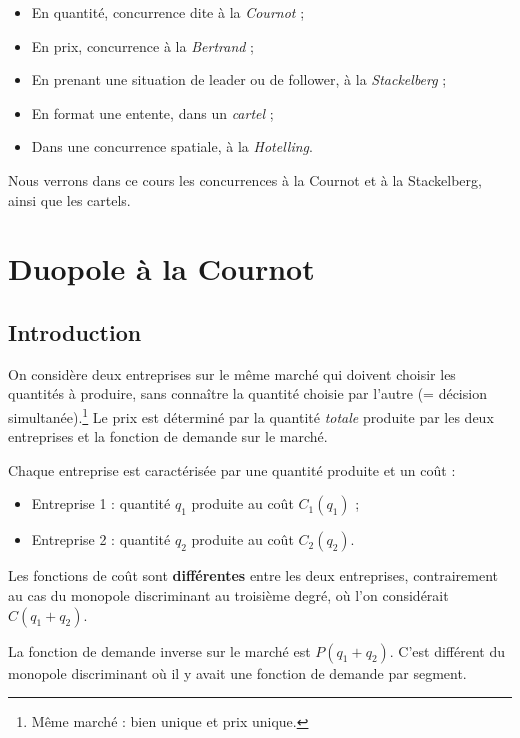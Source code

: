 \documentclass[
]{book}
\providecommand{\tightlist}{%
  \setlength{\itemsep}{0pt}\setlength{\parskip}{0pt}}
\theoremstyle{definition}
\theoremstyle{definition}
\theoremstyle{definition}
\theoremstyle{definition}
\theoremstyle{remark}
\begin{document}
\begin{itemize}
\tightlist
\item
  En quantité, concurrence dite à la \emph{Cournot} ;
\item
  En prix, concurrence à la \emph{Bertrand} ;
\item
  En prenant une situation de leader ou de follower, à la \emph{Stackelberg} ;
\item
  En format une entente, dans un \emph{cartel} ;
\item
  Dans une concurrence spatiale, à la \emph{Hotelling}.
\end{itemize}

Nous verrons dans ce cours les concurrences à la Cournot et à la Stackelberg, ainsi que les cartels.

\hypertarget{duopole-uxe0-la-cournot}{%
\section{Duopole à la Cournot}\label{duopole-uxe0-la-cournot}}

\hypertarget{introduction-1}{%
\subsection{Introduction}\label{introduction-1}}

On considère deux entreprises sur le même marché qui doivent choisir les quantités à produire, sans connaître la quantité choisie par l'autre (= décision simultanée).\footnote{Même marché : bien unique et prix unique.}
Le prix est déterminé par la quantité \emph{totale} produite par les deux entreprises et la fonction de demande sur le marché.

Chaque entreprise est caractérisée par une quantité produite et un coût :

\begin{itemize}
\tightlist
\item
  Entreprise 1 : quantité \(q_1\) produite au coût \(C_1(q_1)\) ;
\item
  Entreprise 2 : quantité \(q_2\) produite au coût \(C_2(q_2)\).
\end{itemize}

Les fonctions de coût sont \textbf{différentes} entre les deux entreprises, contrairement au cas du monopole discriminant au troisième degré, où l'on considérait \(C(q_1+q_2)\).

La fonction de demande inverse sur le marché est \(P(q_1+q_2)\).
C'est différent du monopole discriminant où il y avait une fonction de demande par segment.
\end{document}
